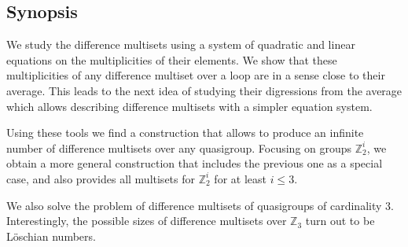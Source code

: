 \subsection{Synopsis}

    We study the difference multisets using a system of quadratic and linear equations on the multiplicities of their elements. We show that these multiplicities of any difference multiset over a loop are in a sense close to their average. This leads to the next idea of studying their digressions from the average which allows describing difference multisets with a simpler equation system.

    Using these tools we find a construction that allows to produce an infinite number of difference multisets over any quasigroup. Focusing on groups $\mathbb Z_2^i$, we obtain a more general construction that includes the previous one as a special case, and also provides all multisets for $\mathbb Z_2^i$ for at least $i \leq 3$.

    We also solve the problem of difference multisets of quasigroups of cardinality 3. Interestingly, the possible sizes of difference multisets over $\mathbb Z_3$ turn out to be Löschian numbers.
    
